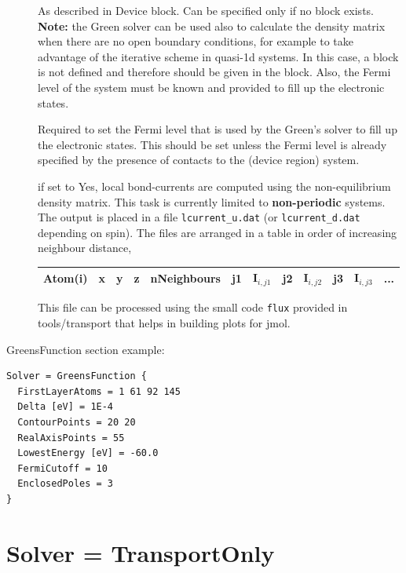 \begin{description}
\item[] As described in Device block. Can be specified only
  if no  block exists.  {\bf Note:} the Green solver can be used
  also to calculate the density matrix when there are no open boundary
  conditions, for example to take advantage of the iterative scheme in quasi-1d
  systems. In this case, a  block is not defined and therefore
   should be given in the  block. Also,
  the Fermi level of the system must be known and provided to fill up the
  electronic states.

\item[] Required to set the
  Fermi level that is used by the Green's solver to fill up the
  electronic states. This should be set unless the Fermi level is
  already specified by the presence of contacts to the (device region)
  system.

\item[] if set to Yes, local bond-currents are computed using
  the non-equilibrium density matrix.  This task is currently limited to
  \textbf{non-periodic} systems. The output is placed in a file
  \verb|lcurrent_u.dat| (or \verb|lcurrent_d.dat| depending on spin).  The files
  are arranged in a table in order of increasing neighbour distance,

\begin{tabular}{|c|c|c|c|c|c|c|c|c|c|c|c|}
  \hline
  Atom(i) & x & y & z &  nNeighbours &  j1 & I$_{i,j1}$ & j2 & I$_{i,j2}$ &  j3 & I$_{i,j3}$ & ...\\
  \hline
\end{tabular}

  This file can be processed using the small code \verb|flux| provided in
  tools/transport that helps in building plots for jmol.
\end{description}

GreensFunction section example:

\begin{verbatim}
Solver = GreensFunction {
  FirstLayerAtoms = 1 61 92 145
  Delta [eV] = 1E-4
  ContourPoints = 20 20
  RealAxisPoints = 55
  LowestEnergy [eV] = -60.0
  FermiCutoff = 10
  EnclosedPoles = 3
}
\end{verbatim}


\section{Solver = TransportOnly}

